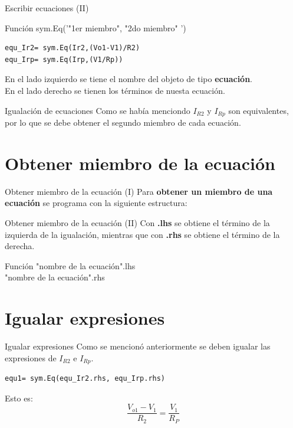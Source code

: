 \documentclass[14pt, aspectratio= 169]{beamer}
\begin{document}
\begin{frame}[fragile]{Escribir ecuaciones (II)}
\begin{block}{Función}
sym.Eq('"1er miembro", "2do miembro" ')
\end{block}
\begin{lstlisting}[style=python]
equ_Ir2= sym.Eq(Ir2,(Vo1-V1)/R2)
equ_Irp= sym.Eq(Irp,(V1/Rp))
\end{lstlisting}
En el lado izquierdo se tiene el nombre del objeto de tipo \textbf{ecuación}. \\
En el lado derecho se tienen los términos de nuesta ecuación.
\end{frame}

\begin{frame}{Igualación de ecuaciones}
Como se había menciondo $I_{R2}$ y $I_{Rp}$ son equivalentes, por lo que se debe obtener el segundo miembro de cada ecuación.
\end{frame}

\section{Obtener miembro de la ecuación}
\begin{frame}{Obtener miembro de la ecuación (I)}
Para \textbf{obtener un miembro de una ecuación} se programa con la siguiente estructura:
\end{frame}

\begin{frame}[fragile]{Obtener miembro de la ecuación (II)}
Con \textbf{.lhs} se obtiene el término de la izquierda de la igualación, mientras que con \textbf{.rhs} se obtiene el término de la derecha.
\begin{block}{Función}
"nombre de la ecuación".lhs \\
"nombre de la ecuación".rhs
\end{block}
\end{frame}

\section{Igualar expresiones}
\begin{frame}[fragile]{Igualar expresiones}
Como se mencionó anteriormente se deben igualar las expresiones de $I_{R2}$ e $I_{Rp}$.

\begin{lstlisting}[style=python]
equ1= sym.Eq(equ_Ir2.rhs, equ_Irp.rhs)
\end{lstlisting}

Esto es:
$$ \boxed{ \frac{V_{o1}-V_{1}}{R_{2}}= \frac{V_{1}}{R_{P}} } $$
\end{frame}
\end{document}
